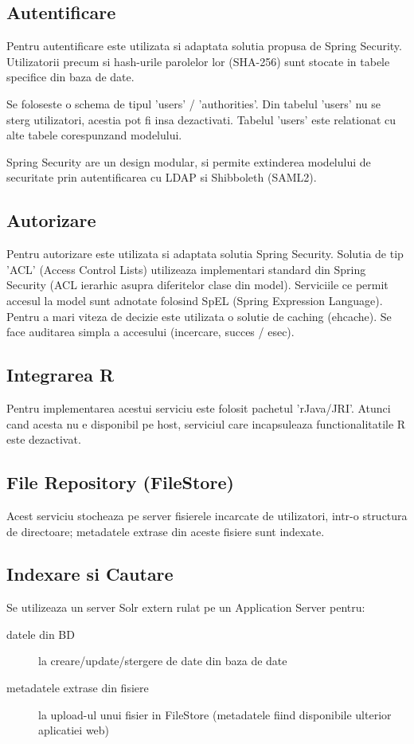 \subsection{Autentificare}
Pentru autentificare este utilizata si adaptata solutia propusa de Spring Security.
Utilizatorii precum si hash-urile parolelor lor (SHA-256) sunt stocate in
tabele specifice din baza de date.

Se foloseste o schema de tipul 'users' / 'authorities'.
Din tabelul 'users' nu se sterg utilizatori, acestia pot fi insa dezactivati.
Tabelul 'users' este relationat cu alte tabele corespunzand modelului.

Spring Security are un design modular, si permite extinderea modelului de
securitate prin autentificarea cu LDAP si Shibboleth (SAML2).

\subsection{Autorizare}
Pentru autorizare este utilizata si adaptata solutia Spring Security.
Solutia de tip 'ACL' (Access Control Lists) utilizeaza implementari standard din
Spring Security (ACL ierarhic asupra diferitelor clase din model). 
Serviciile ce permit accesul la model sunt adnotate folosind SpEL
(Spring Expression Language).
Pentru a mari viteza de decizie este utilizata o solutie de caching (ehcache). 
Se face auditarea simpla a accesului (incercare, succes / esec). 

\subsection{Integrarea R}
Pentru implementarea acestui serviciu este folosit pachetul 'rJava/JRI'. %
Atunci cand acesta nu e disponibil pe host, serviciul care
incapsuleaza functionalitatile R este dezactivat.

\subsection{File Repository (FileStore)}
Acest serviciu stocheaza pe server fisierele incarcate de utilizatori, 
intr-o structura de directoare;
metadatele extrase din aceste fisiere sunt indexate.

\subsection{Indexare si Cautare}
Se utilizeaza un server Solr extern rulat pe un
Application Server pentru:
\begin{description}
\item[datele din BD] la creare/update/stergere de date din baza de
date
\item[metadatele extrase din fisiere] la upload-ul unui fisier
in FileStore (metadatele fiind disponibile ulterior aplicatiei web)
\end{description}

